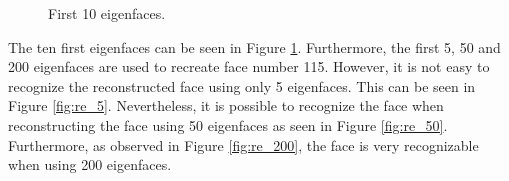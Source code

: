 \documentclass[a4paper,10pt]{article}
\begin{document}
\begin{figure}[H]
{  }
  \caption{First 10 eigenfaces.}
  \label{fig:eigenfaces}
\end{figure}

The ten first eigenfaces can be seen in Figure {\ref{fig:eigenfaces}}.
Furthermore, the first 5, 50 and 200 eigenfaces are used to
recreate face number 115. However, it is not easy to recognize the
reconstructed face using only 5 eigenfaces. This can be seen in
Figure {\ref{fig:re_5}}. Nevertheless, it is possible to recognize
the face when reconstructing the face using 50
eigenfaces as seen in Figure {\ref{fig:re_50}}. Furthermore,
as observed in Figure {\ref{fig:re_200}}, the face is very
recognizable when using 200 eigenfaces.
\end{document}
